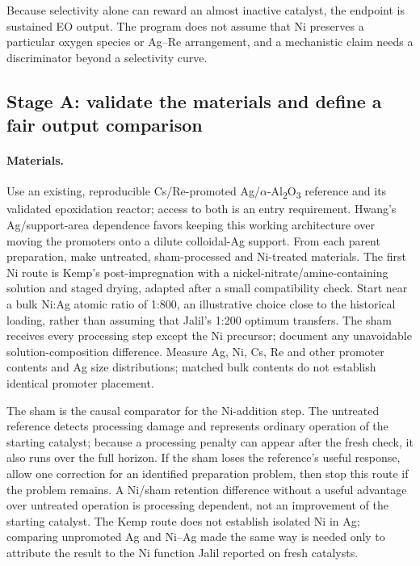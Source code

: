 Because selectivity alone can reward an almost inactive catalyst, the endpoint is sustained EO output. The program does not assume that Ni preserves a particular oxygen species or Ag--Re arrangement, and a mechanistic claim needs a discriminator beyond a selectivity curve.

\subsection{Stage A: validate the materials and define a fair output comparison}

\paragraph{Materials.}
Use an existing, reproducible Cs/Re-promoted Ag/$\alpha$-Al\textsubscript{2}O\textsubscript{3} reference and its validated epoxidation reactor; access to both is an entry requirement. Hwang's Ag/support-area dependence favors keeping this working architecture over moving the promoters onto a dilute colloidal-Ag support.\citep{hwang2026} From each parent preparation, make untreated, sham-processed and Ni-treated materials. The first Ni route is Kemp's post-impregnation with a nickel-nitrate/amine-containing solution and staged drying, adapted after a small compatibility check. Start near a bulk Ni:Ag atomic ratio of 1:800, an illustrative choice close to the historical loading, rather than assuming that Jalil's 1:200 optimum transfers. The sham receives every processing step except the Ni precursor; document any unavoidable solution-composition difference. Measure Ag, Ni, Cs, Re and other promoter contents and Ag size distributions; matched bulk contents do not establish identical promoter placement.

The sham is the causal comparator for the Ni-addition step. The untreated reference detects processing damage and represents ordinary operation of the starting catalyst; because a processing penalty can appear after the fresh check, it also runs over the full horizon. If the sham loses the reference's useful response, allow one correction for an identified preparation problem, then stop this route if the problem remains. A Ni/sham retention difference without a useful advantage over untreated operation is processing dependent, not an improvement of the starting catalyst. The Kemp route does not establish isolated Ni in Ag; comparing unpromoted Ag and Ni--Ag made the same way is needed only to attribute the result to the Ni function Jalil reported on fresh catalysts.

